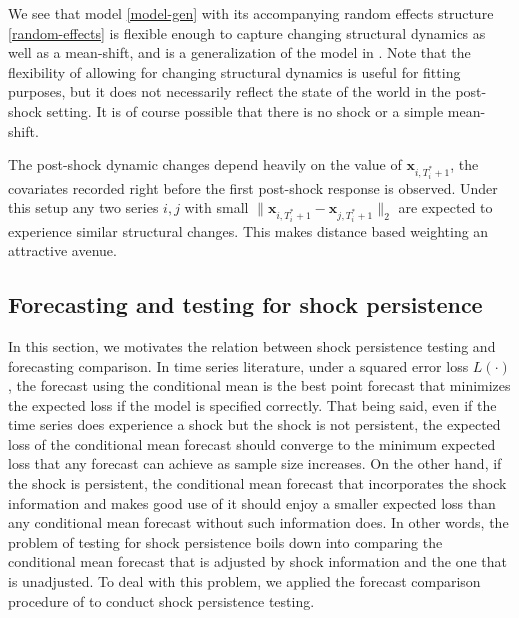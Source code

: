 \documentclass[11pt]{article}
\def\mbf#1{\mathbf{#1}} %
\theoremstyle{definition}
\begin{document}
We see that model \eqref{model-gen} with its accompanying random effects structure \eqref{random-effects} is flexible enough to capture changing structural dynamics as well as a mean-shift, and is a generalization of the model in \cite{lin2021minimizing}. Note that the flexibility of allowing for changing structural dynamics is useful for fitting purposes, but it does not necessarily reflect the state of the world in the post-shock setting. It is of course possible that there is no shock or a simple mean-shift. 

The post-shock dynamic changes depend heavily on the value of $\mbf{x}_{i,T_i^*+1}$, the covariates recorded right before the first post-shock response is observed. Under this setup any two series $i,j$ with small $\|\mbf{x}_{i,T_i^*+1} - \mbf{x}_{j,T_i^*+1}\|_2$ are expected to experience similar structural changes. This makes distance based weighting an attractive avenue.










\subsection{Forecasting and testing for shock persistence}
\label{forecast}


In this section, we motivates the relation between shock persistence testing and forecasting comparison. In time series literature, under a squared error loss $L(\cdot)$, the forecast using the conditional mean is the best point forecast that minimizes the expected loss if the model is specified correctly. That being said, even if the time series does experience a shock but the shock is not persistent, the expected loss of the conditional mean forecast should converge to the minimum expected loss that any forecast can achieve as sample size increases. On the other hand, if the shock is persistent, the conditional mean forecast that incorporates the shock information and makes good use of it should enjoy a smaller expected loss than any conditional mean forecast without such information does. In other words, the problem of testing for shock persistence boils down into comparing the conditional mean forecast that is adjusted by shock information and the one that is unadjusted. To deal with this problem, we applied the forecast comparison procedure of  \cite{quaedvlieg2021multi} to conduct shock persistence testing.
\end{document}
